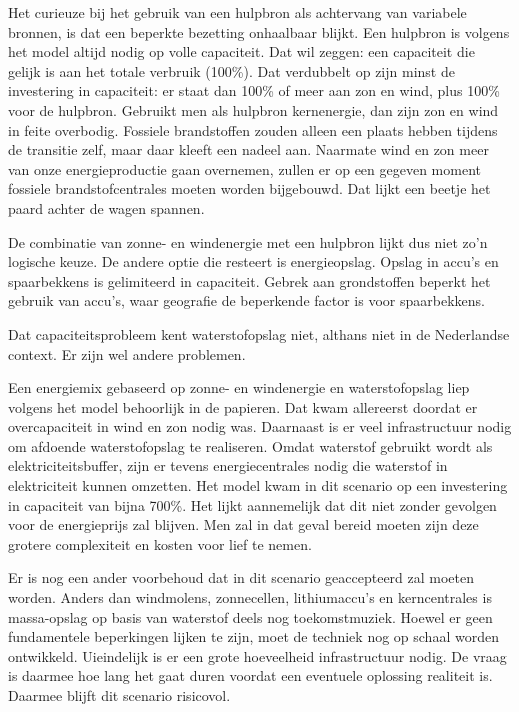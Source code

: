 \documentclass[
  11pt,
  a4paper,
]{book}
\begin{document}
Het curieuze bij het gebruik van een hulpbron als achtervang van variabele bronnen, is dat een beperkte bezetting onhaalbaar blijkt. Een hulpbron is volgens het model altijd nodig op volle capaciteit. Dat wil zeggen: een capaciteit die gelijk is aan het totale verbruik (100\%). Dat verdubbelt op zijn minst de investering in capaciteit: er staat dan 100\% of meer aan zon en wind, plus 100\% voor de hulpbron. Gebruikt men als hulpbron kernenergie, dan zijn zon en wind in feite overbodig. Fossiele brandstoffen zouden alleen een plaats hebben tijdens de transitie zelf, maar daar kleeft een nadeel aan. Naarmate wind en zon meer van onze energieproductie gaan overnemen, zullen er op een gegeven moment fossiele brandstofcentrales moeten worden bijgebouwd. Dat lijkt een beetje het paard achter de wagen spannen.

De combinatie van zonne- en windenergie met een hulpbron lijkt dus niet zo'n logische keuze. De andere optie die resteert is energieopslag. Opslag in accu's en spaarbekkens is gelimiteerd in capaciteit. Gebrek aan grondstoffen beperkt het gebruik van accu's, waar geografie de beperkende factor is voor spaarbekkens.

Dat capaciteitsprobleem kent waterstofopslag niet, althans niet in de Nederlandse context. Er zijn wel andere problemen.

Een energiemix gebaseerd op zonne- en windenergie en waterstofopslag liep volgens het model behoorlijk in de papieren. Dat kwam allereerst doordat er overcapaciteit in wind en zon nodig was. Daarnaast is er veel infrastructuur nodig om afdoende waterstofopslag te realiseren. Omdat waterstof gebruikt wordt als elektriciteitsbuffer, zijn er tevens energiecentrales nodig die waterstof in elektriciteit kunnen omzetten. Het model kwam in dit scenario op een investering in capaciteit van bijna 700\%. Het lijkt aannemelijk dat dit niet zonder gevolgen voor de energieprijs zal blijven. Men zal in dat geval bereid moeten zijn deze grotere complexiteit en kosten voor lief te nemen.

Er is nog een ander voorbehoud dat in dit scenario geaccepteerd zal moeten worden. Anders dan windmolens, zonnecellen, lithiumaccu's en kerncentrales is massa-opslag op basis van waterstof deels nog toekomstmuziek. Hoewel er geen fundamentele beperkingen lijken te zijn, moet de techniek nog op schaal worden ontwikkeld. Uieindelijk is er een grote hoeveelheid infrastructuur nodig. De vraag is daarmee hoe lang het gaat duren voordat een eventuele oplossing realiteit is. Daarmee blijft dit scenario risicovol.
\end{document}
